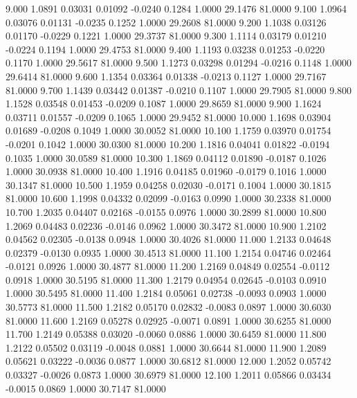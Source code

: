    9.000   1.0891   0.03031   0.01092  -0.0240   0.1284   1.0000  29.1476  81.0000
   9.100   1.0964   0.03076   0.01131  -0.0235   0.1252   1.0000  29.2608  81.0000
   9.200   1.1038   0.03126   0.01170  -0.0229   0.1221   1.0000  29.3737  81.0000
   9.300   1.1114   0.03179   0.01210  -0.0224   0.1194   1.0000  29.4753  81.0000
   9.400   1.1193   0.03238   0.01253  -0.0220   0.1170   1.0000  29.5617  81.0000
   9.500   1.1273   0.03298   0.01294  -0.0216   0.1148   1.0000  29.6414  81.0000
   9.600   1.1354   0.03364   0.01338  -0.0213   0.1127   1.0000  29.7167  81.0000
   9.700   1.1439   0.03442   0.01387  -0.0210   0.1107   1.0000  29.7905  81.0000
   9.800   1.1528   0.03548   0.01453  -0.0209   0.1087   1.0000  29.8659  81.0000
   9.900   1.1624   0.03711   0.01557  -0.0209   0.1065   1.0000  29.9452  81.0000
  10.000   1.1698   0.03904   0.01689  -0.0208   0.1049   1.0000  30.0052  81.0000
  10.100   1.1759   0.03970   0.01754  -0.0201   0.1042   1.0000  30.0300  81.0000
  10.200   1.1816   0.04041   0.01822  -0.0194   0.1035   1.0000  30.0589  81.0000
  10.300   1.1869   0.04112   0.01890  -0.0187   0.1026   1.0000  30.0938  81.0000
  10.400   1.1916   0.04185   0.01960  -0.0179   0.1016   1.0000  30.1347  81.0000
  10.500   1.1959   0.04258   0.02030  -0.0171   0.1004   1.0000  30.1815  81.0000
  10.600   1.1998   0.04332   0.02099  -0.0163   0.0990   1.0000  30.2338  81.0000
  10.700   1.2035   0.04407   0.02168  -0.0155   0.0976   1.0000  30.2899  81.0000
  10.800   1.2069   0.04483   0.02236  -0.0146   0.0962   1.0000  30.3472  81.0000
  10.900   1.2102   0.04562   0.02305  -0.0138   0.0948   1.0000  30.4026  81.0000
  11.000   1.2133   0.04648   0.02379  -0.0130   0.0935   1.0000  30.4513  81.0000
  11.100   1.2154   0.04746   0.02464  -0.0121   0.0926   1.0000  30.4877  81.0000
  11.200   1.2169   0.04849   0.02554  -0.0112   0.0918   1.0000  30.5195  81.0000
  11.300   1.2179   0.04954   0.02645  -0.0103   0.0910   1.0000  30.5495  81.0000
  11.400   1.2184   0.05061   0.02738  -0.0093   0.0903   1.0000  30.5773  81.0000
  11.500   1.2182   0.05170   0.02832  -0.0083   0.0897   1.0000  30.6030  81.0000
  11.600   1.2169   0.05278   0.02925  -0.0071   0.0891   1.0000  30.6255  81.0000
  11.700   1.2149   0.05388   0.03020  -0.0060   0.0886   1.0000  30.6459  81.0000
  11.800   1.2122   0.05502   0.03119  -0.0048   0.0881   1.0000  30.6644  81.0000
  11.900   1.2089   0.05621   0.03222  -0.0036   0.0877   1.0000  30.6812  81.0000
  12.000   1.2052   0.05742   0.03327  -0.0026   0.0873   1.0000  30.6979  81.0000
  12.100   1.2011   0.05866   0.03434  -0.0015   0.0869   1.0000  30.7147  81.0000
